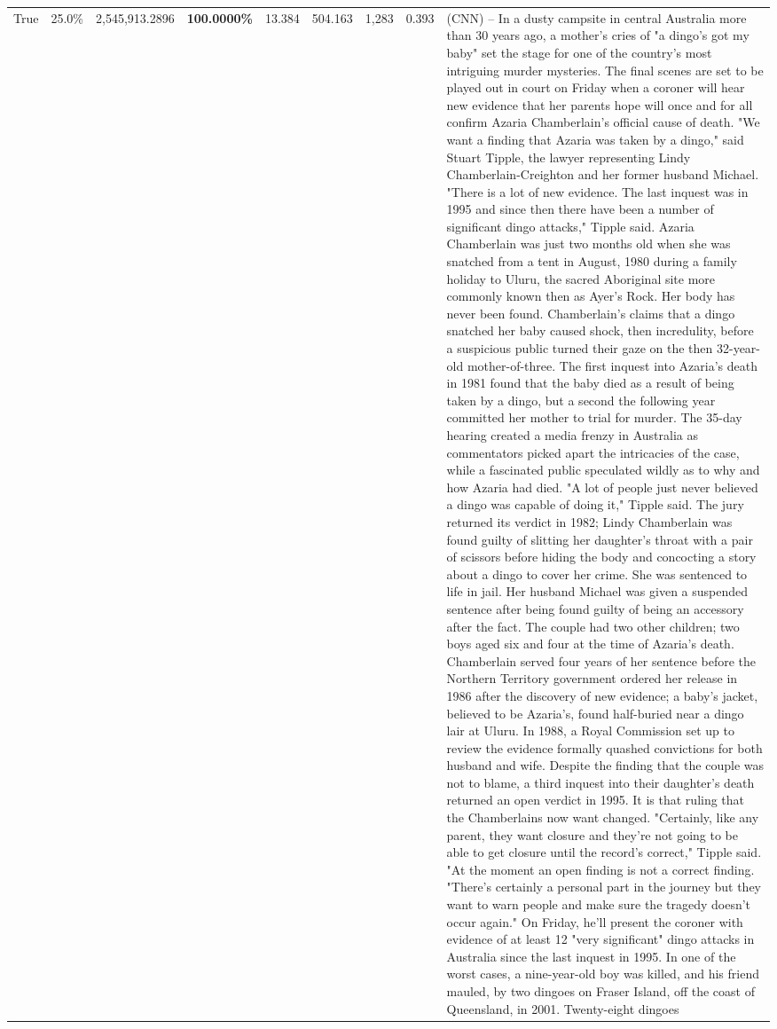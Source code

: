 \begin{table}[H]
\begin{tabular}{lllrlllll}
True & 25.0\% & 2,545,913.2896 & \bfseries \color{red} 100.0000\% & 13.384 & 504.163 & 1,283 & 0.393 & (CNN) -- In a dusty campsite in central Australia more than 30 years ago, a mother's cries of "a dingo's got my baby" set the stage for one of the country's most intriguing murder mysteries. The final scenes are set to be played out in court on Friday when a coroner will hear new evidence that her parents hope will once and for all confirm Azaria Chamberlain's official cause of death. "We want a finding that Azaria was taken by a dingo," said Stuart Tipple, the lawyer representing Lindy Chamberlain-Creighton and her former husband Michael. "There is a lot of new evidence. The last inquest was in 1995 and since then there have been a number of significant dingo attacks," Tipple said. Azaria Chamberlain was just two months old when she was snatched from a tent in August, 1980 during a family holiday to Uluru, the sacred Aboriginal site more commonly known then as Ayer's Rock. Her body has never been found. Chamberlain's claims that a dingo snatched her baby caused shock, then incredulity, before a suspicious public turned their gaze on the then 32-year-old mother-of-three. The first inquest into Azaria's death in 1981 found that the baby died as a result of being taken by a dingo, but a second the following year committed her mother to trial for murder. The 35-day hearing created a media frenzy in Australia as commentators picked apart the intricacies of the case, while a fascinated public speculated wildly as to why and how Azaria had died. "A lot of people just never believed a dingo was capable of doing it," Tipple said. The jury returned its verdict in 1982; Lindy Chamberlain was found guilty of slitting her daughter's throat with a pair of scissors before hiding the body and concocting a story about a dingo to cover her crime. She was sentenced to life in jail. Her husband Michael was given a suspended sentence after being found guilty of being an accessory after the fact. The couple had two other children; two boys aged six and four at the time of Azaria's death. Chamberlain served four years of her sentence before the Northern Territory government ordered her release in 1986 after the discovery of new evidence; a baby's jacket, believed to be Azaria's, found half-buried near a dingo lair at Uluru. In 1988, a Royal Commission set up to review the evidence formally quashed convictions for both husband and wife. Despite the finding that the couple was not to blame, a third inquest into their daughter's death returned an open verdict in 1995. It is that ruling that the Chamberlains now want changed. "Certainly, like any parent, they want closure and they're not going to be able to get closure until the record's correct," Tipple said. "At the moment an open finding is not a correct finding. "There's certainly a personal part in the journey but they want to warn people and make sure the tragedy doesn't occur again." On Friday, he'll present the coroner with evidence of at least 12 "very significant" dingo attacks in Australia since the last inquest in 1995. In one of the worst cases, a nine-year-old boy was killed, and his friend mauled, by two dingoes on Fraser Island, off the coast of Queensland, in 2001. Twenty-eight dingoes 
\end{tabular}
\end{table}
